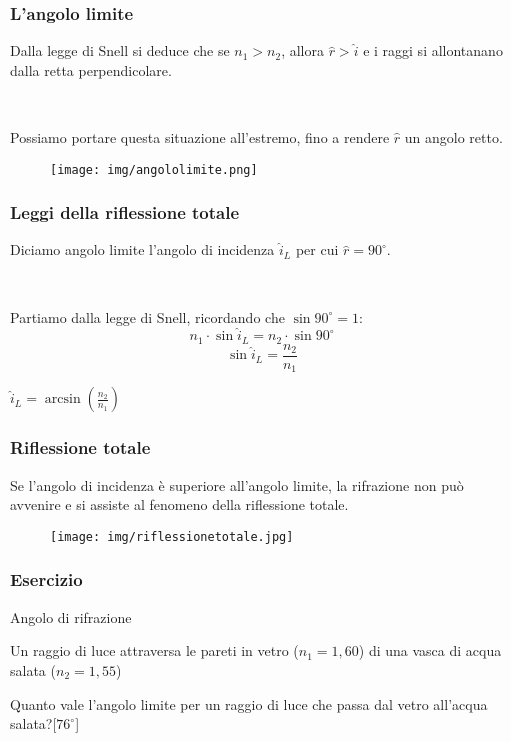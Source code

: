 \documentclass[]{beamer}
\theoremstyle{plain}
\begin{document}
\begin{frame}
\frametitle{L'angolo limite}
Dalla legge di Snell si deduce che se $ n_1 > n_2 $, allora $ \hat{r} > \hat{i} $ e i raggi si allontanano dalla retta perpendicolare.

~

Possiamo portare questa situazione all'estremo, fino a rendere $ \hat{r} $ un angolo retto.
\begin{figure}
\texttt{[image: img/angololimite.png]}
\end{figure}
\end{frame}

\begin{frame}
\frametitle{Leggi della riflessione totale}
Diciamo \alert{angolo limite} l'angolo di incidenza $ \hat{i}_L $ per cui $ \hat{r} = 90^\circ $.\pause

~

Partiamo dalla legge di Snell, ricordando che $ \sin 90^\circ = 1 $:
\[  n_1 \cdot \sin \hat{i}_L = n_2 \cdot\sin 90^\circ \]\pause
\[ \sin\hat{i}_L = \frac{n_2}{n_1} \]\pause
\begin{center}
\colorbox{blue!30}{$\displaystyle \hat{i}_L = \arcsin\left(\frac{n_2}{n_1}\right) $}
\end{center}
\begin{center}
  \href{https://www.youtube.com/watch?v=NAaHPRsveJk}{}
\end{center}


\end{frame}


\begin{frame}
\frametitle{Riflessione totale}
Se l'angolo di incidenza è superiore all'angolo limite, la rifrazione non può avvenire e si assiste al fenomeno della \alert{riflessione totale}.

\begin{figure}
\texttt{[image: img/riflessionetotale.jpg]}
\end{figure}
\end{frame}




\begin{frame}
\frametitle{Esercizio}
\begin{exampleblock}{Angolo di rifrazione}
{\small Un raggio di luce attraversa le pareti in vetro ($ n_1 = 1,60  $) di una vasca di acqua salata ($ n_2 = 1,55 $)

Quanto vale l'angolo limite per un raggio di luce che passa dal vetro all'acqua salata?\hspace*{\fill}[$ 76^\circ $]}
\end{exampleblock}
\end{frame}
\end{document}

